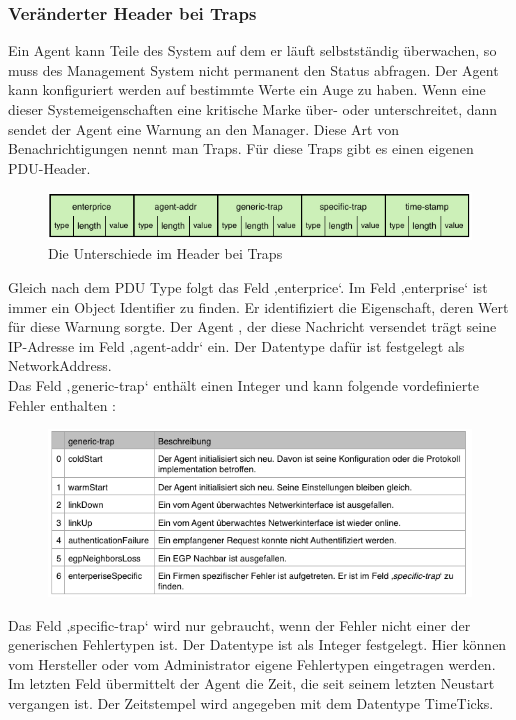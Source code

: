 \documentclass[11pt,a4paper]{article}
\begin{document}
\subsubsection{Veränderter Header bei Traps}
Ein Agent kann Teile des System auf dem er läuft selbstständig überwachen, so muss des Management System nicht permanent den Status abfragen. Der Agent kann konfiguriert werden auf bestimmte Werte ein Auge zu haben. Wenn eine dieser Systemeigenschaften eine kritische Marke über- oder unterschreitet, dann sendet der Agent eine Warnung an den Manager. Diese Art von Benachrichtigungen nennt man Traps. Für diese Traps gibt es einen eigenen PDU-Header.\\
\begin{figure}[h]
	\centering
	\includegraphics[scale=1]{Bilder/SNMPv1-Header-Traps}
	\caption{Die Unterschiede im Header bei Traps}
\end{figure}
Gleich nach dem PDU Type folgt das Feld ‚enterprice‘. Im Feld ‚enterprise‘ ist immer ein Object Identifier zu finden. Er identifiziert die Eigenschaft, deren Wert für diese Warnung sorgte. Der Agent , der diese Nachricht versendet trägt seine IP-Adresse im Feld ‚agent-addr‘ ein. Der Datentype dafür ist festgelegt als NetworkAddress.\\
Das Feld ‚generic-trap‘ enthält einen Integer und kann folgende vordefinierte Fehler enthalten :\\
\begin{figure}[h]
	\centering
	\includegraphics[scale=1]{Bilder/SNMPv1-Traps-Fehler}
\end{figure}
Das Feld ‚specific-trap‘ wird nur gebraucht, wenn der Fehler nicht einer der generischen Fehlertypen ist. Der Datentype ist als Integer festgelegt. Hier können vom Hersteller oder vom Administrator eigene Fehlertypen eingetragen werden.\\
Im letzten Feld übermittelt der Agent die Zeit, die seit seinem letzten Neustart vergangen ist. Der Zeitstempel wird angegeben mit dem Datentype TimeTicks.\\
\end{document}
